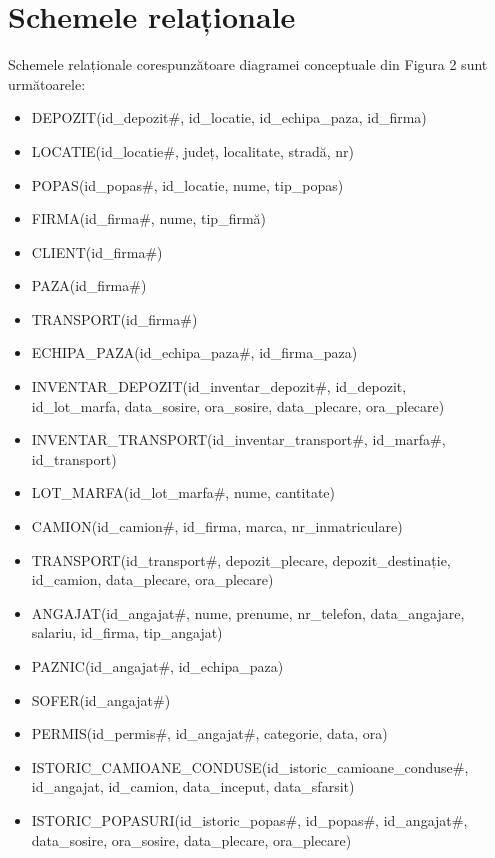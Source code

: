 \documentclass[12pt, a4paper]{article}
\begin{document}
\section{Schemele relaționale}
\quad \par
Schemele relaționale corespunzătoare diagramei conceptuale din Figura 2 sunt următoarele:
\begin{itemize}
    \item DEPOZIT(id\_depozit\#, id\_locatie, id\_echipa\_paza, id\_firma)
    \item LOCATIE(id\_locatie\#, județ, localitate, stradă, nr)
    \item POPAS(id\_popas\#, id\_locatie, nume, tip\_popas)
    \item FIRMA(id\_firma\#, nume, tip\_firmă)
    \item CLIENT(id\_firma\#)
    \item PAZA(id\_firma\#)
    \item TRANSPORT(id\_firma\#)
    \item ECHIPA\_PAZA(id\_echipa\_paza\#, id\_firma\_paza)
    \item INVENTAR\_DEPOZIT(id\_inventar\_depozit\#, id\_depozit, \\id\_lot\_marfa, data\_sosire, ora\_sosire, data\_plecare, ora\_plecare)
    \item INVENTAR\_TRANSPORT(id\_inventar\_transport\#, id\_marfa\#,\\ id\_transport)
    \item LOT\_MARFA(id\_lot\_marfa\#, nume, cantitate)
    \item CAMION(id\_camion\#, id\_firma, marca, nr\_inmatriculare)
    \item TRANSPORT(id\_transport\#, depozit\_plecare, depozit\_destinație,\\ id\_camion, data\_plecare, ora\_plecare)
    \item ANGAJAT(id\_angajat\#, nume, prenume, nr\_telefon, data\_angajare, salariu, id\_firma, tip\_angajat)
    \item PAZNIC(id\_angajat\#, id\_echipa\_paza)
    \item SOFER(id\_angajat\#)
    \item PERMIS(id\_permis\#, id\_angajat\#, categorie, data, ora)
    \item ISTORIC\_CAMIOANE\_CONDUSE(id\_istoric\_camioane\_conduse\#,\\ id\_angajat, id\_camion, data\_inceput, data\_sfarsit)
    \item ISTORIC\_POPASURI(id\_istoric\_popas\#, id\_popas\#, id\_angajat\#,\\ data\_sosire, ora\_sosire, data\_plecare, ora\_plecare)
\end{itemize}
\end{document}
